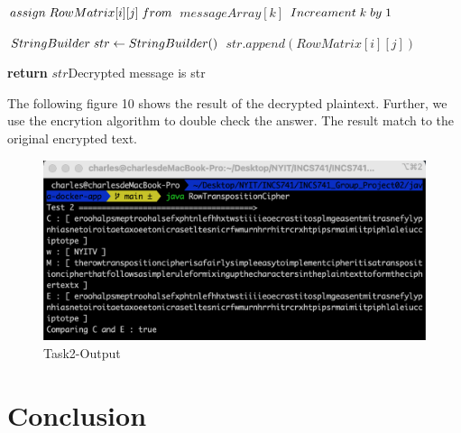 \documentclass[twoside,twocolumn]{article}
\begin{document}
\begin{algorithm}
\begin{algorithmic}[1]
        	   \State $assign \hspace{0.1cm}  RowMatrix[i][j] \hspace{0.1cm}  from$
        	   \State $messageArray[k]$
        	   \State \footnotesize $Increament\hspace{0.1cm} k\hspace{0.1cm} by \hspace{0.1cm}1$	
        	   \State \footnotesize$ $
		    \EndIf
        \EndFor  
      \EndFor  
               
      \State \footnotesize $ StringBuilder\hspace{0.1cm} str \gets StringBuilder()$
	  		\State $ str.append(RowMatrix[i][j]) $
		    \EndIf
        \EndFor  
      \EndFor  
      
      \State \textbf{return} $str$\Comment \tiny{Decrypted message is str}
    \EndFunction
  \end{algorithmic}
\end{algorithm}

The following figure 10 shows the result of the decrypted plaintext. Further, we use the encrytion algorithm to double check the answer. The result match to the original encrypted text.

\begin{figure}[H]
  \centering
  \includegraphics[scale=0.35]{./Graphs/Figure2.0.png}
  \caption{Task2-Output}
  \label{fig:testfig1}
\end{figure}




\section{Conclusion}
\end{document}
